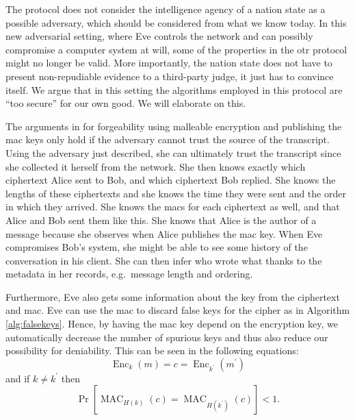 \documentclass[draft]{llncs}
\DeclareMathOperator{\enc}{\mathrm{Enc}}
\DeclareMathOperator{\mac}{\mathrm{MAC}}
\begin{document}
The protocol does not consider the intelligence agency of a nation state as 
a possible adversary, which should be considered from what we know today.
In this new adversarial setting, where Eve controls the network and can 
possibly compromise a computer system at will, some of the properties in the 
\ac{otr} protocol might no longer be valid.
More importantly, the nation state does not have to present non-repudiable 
evidence to a third-party judge, it just has to convince itself.
We argue that in this setting the algorithms employed in this protocol are 
\enquote{too secure} for our own good.
We will elaborate on this.

The arguments in \cite{otr2004} for forgeability using malleable encryption and 
publishing the \ac{mac} keys only hold if the adversary cannot trust the source 
of the transcript.
Using the adversary just described, she can ultimately trust the transcript 
since she collected it herself from the network.
She then knows exactly which ciphertext Alice sent to Bob, and which ciphertext 
Bob replied.
She knows the lengths of these ciphertexts and she knows the time they were 
sent and the order in which they arrived.
She knows the \acp{mac} for each ciphertext as well, and that Alice and Bob 
sent them like this.
She knows that Alice is the author of a message because she observes when Alice 
publishes the \ac{mac} key.
When Eve compromises Bob's system, she might be able to see some history of the 
conversation in his client.
She can then infer who wrote what thanks to the metadata in her records, e.g.\ 
message length and ordering.

Furthermore, Eve also gets some information about the key from the ciphertext 
and \ac{mac}.
Eve can use the \ac{mac} to discard false keys for the cipher as in Algorithm 
\ref{alg:falsekeys}.
Hence, by having the \ac{mac} key depend on the encryption key, we 
automatically decrease the number of spurious keys and thus also reduce our 
possibility for deniability.
This can be seen in the following equations:
\begin{equation*}
  \enc_k( m ) = c = \enc_{k^\prime}( m^\prime )
\end{equation*}
and if \(k\neq k^\prime\) then
\begin{equation*}
  \Pr\left[
    \mac_{H(k)}( c ) = \mac_{H(k^\prime)}( c )
  \right] < 1.
\end{equation*}
\end{document}
